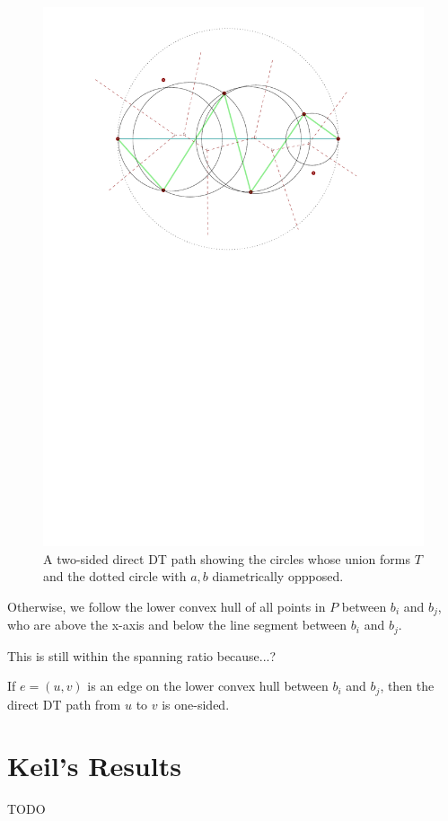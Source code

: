 \documentclass{tufte-handout}
\begin{document}
\begin{figure}
  \includegraphics[scale=1.0]{figures/two_sided_path_center_circles.pdf}
  \caption{A two-sided direct DT path showing the circles whose union
    forms $T$ and the dotted circle with $a,b$ diametrically
    oppposed.}
\end{figure}

Otherwise, we follow the lower convex hull of all points in $P$
between $b_i$ and $b_j$, who are above the x-axis and below the line
segment between $b_i$ and $b_j$.

This is still within the spanning ratio because...?

\begin{Lemma}

  If $e = (u,v)$ is an edge on the lower convex hull between $b_i$ and
  $b_j$, then the direct DT path from $u$ to $v$ is one-sided.
  
\end{Lemma}

\newpage
\part{Keil's Results}

TODO


\newpage

\end{document}
